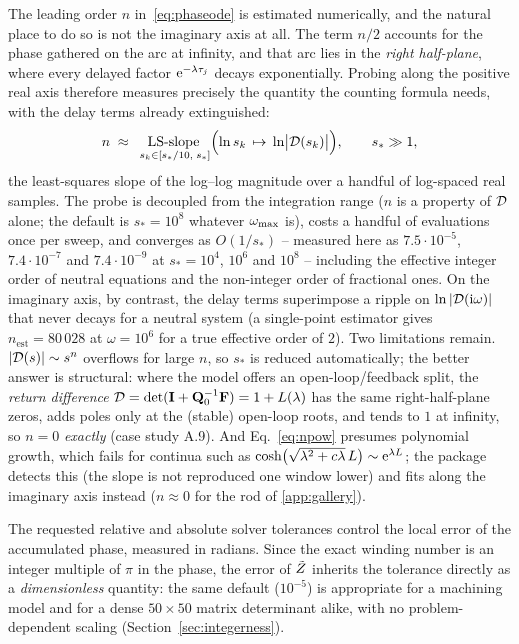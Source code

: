 The leading order $n$ in~\eqref{eq:phaseode} is estimated numerically, and
the natural place to do so is not the imaginary axis at all. The term $n/2$
accounts for the phase gathered on the arc at infinity, and that arc lies in
the \emph{right half-plane}, where every delayed factor $\mathrm{e}^{-\lambda\tau_j}$
decays exponentially. Probing along the positive real axis therefore
measures precisely the quantity the counting formula needs, with the delay
terms already extinguished:
\begin{equation}\label{eq:npow}
  n \;\approx\; \operatorname*{LS\text{-}slope}_{\;s_k\in[s_\ast/10,\;s_\ast]}
  \Bigl(\ln s_k \,\mapsto\, \ln\bigl|\mathcal{D}(s_k)\bigr|\Bigr),
  \qquad s_\ast \gg 1 ,
\end{equation}
the least-squares slope of the log--log magnitude over a handful of
log-spaced real samples. The probe is decoupled from the integration range
($n$ is a property of $\mathcal{D}$ alone; the default is $s_\ast=10^{8}$ whatever
$\omega_{\mathrm{max}}$ is), costs a handful of evaluations once per sweep, and converges as
$O(1/s_\ast)$ -- measured here as $7.5\cdot10^{-5}$, $7.4\cdot10^{-7}$ and
$7.4\cdot10^{-9}$ at $s_\ast=10^{4}$, $10^{6}$ and $10^{8}$ -- including the
effective integer order of neutral equations and the non-integer order of
fractional ones. On the imaginary axis, by contrast, the delay terms
superimpose a ripple on $\ln|\mathcal{D}(\mathrm{i}\omega)|$ that never decays for a
neutral system (a single-point estimator gives $n_{\mathrm{est}}=80\,028$ at
$\omega=10^{6}$ for a true effective order of $2$). Two limitations remain.
$|\mathcal{D}(s)|\sim s^{n}$ overflows for large $n$, so $s_\ast$ is reduced
automatically; the better answer is structural: where the model offers an
open-loop/feedback split, the \emph{return difference}
$\mathcal{D}=\det(\mathbf{I}+\mathbf{Q}_0^{-1}\mathbf{F})=1+L(\lambda)$ has the same
right-half-plane zeros, adds poles only at the (stable) open-loop roots, and
tends to $1$ at infinity, so $n=0$ \emph{exactly} (case study A.9). And
Eq.~\eqref{eq:npow} presumes polynomial growth, which fails for continua
such as $\cosh\bigl(\sqrt{\lambda^2+c\lambda}\,L\bigr)\sim\mathrm{e}^{\lambda L}$; the
package detects this (the slope is not reproduced one window lower) and fits
along the imaginary axis instead ($n\approx0$ for the rod of
\ref{app:gallery}).

The requested relative and absolute solver tolerances control the local
error of the accumulated phase, measured in radians. Since the exact
winding number is an integer multiple of $\pi$ in the phase, the error of
$\tilde{Z}$ inherits the tolerance directly as a \emph{dimensionless} quantity:
the same default ($10^{-5}$) is appropriate for a machining model and for a
dense $50\times50$ matrix determinant alike, with no problem-dependent
scaling (Section~\ref{sec:integerness}).

